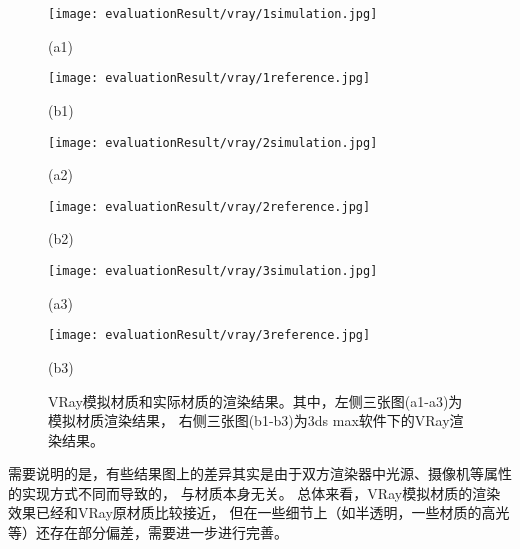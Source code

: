 \begin{figure}                 %
    \begin{minipage}{0.40\textwidth}  %
      \centerline{\texttt{[image: evaluationResult/vray/1simulation.jpg]}}
      \centerline{(a1)}
    \end{minipage}
    \hfill
    \begin{minipage}{0.40\textwidth}  %
      \centerline{\texttt{[image: evaluationResult/vray/1reference.jpg]}}
      \centerline{(b1)}
    \end{minipage}
    \vfill
    \begin{minipage}{0.40\textwidth}  %
        \centerline{\texttt{[image: evaluationResult/vray/2simulation.jpg]}}
        \centerline{(a2)}
    \end{minipage}
    \hfill
    \begin{minipage}{0.40\textwidth}  %
    \centerline{\texttt{[image: evaluationResult/vray/2reference.jpg]}}
    \centerline{(b2)}
    \end{minipage}
    \vfill
    \begin{minipage}{0.40\textwidth}  %
    \centerline{\texttt{[image: evaluationResult/vray/3simulation.jpg]}}
    \centerline{(a3)}
    \end{minipage}
    \hfill
    \begin{minipage}{0.40\textwidth}  %
    \centerline{\texttt{[image: evaluationResult/vray/3reference.jpg]}}
    \centerline{(b3)}
    \end{minipage}    
    \vfill
    \caption{VRay模拟材质和实际材质的渲染结果。其中，左侧三张图(a1-a3)为模拟材质渲染结果，
    右侧三张图(b1-b3)为3ds max软件下的VRay渲染结果。}
    \label{fig:lab3compare}
\end{figure}

需要说明的是，有些结果图上的差异其实是由于双方渲染器中光源、摄像机等属性的实现方式不同而导致的，
与材质本身无关。
总体来看，VRay模拟材质的渲染效果已经和VRay原材质比较接近，
但在一些细节上（如半透明，一些材质的高光等）还存在部分偏差，需要进一步进行完善。

